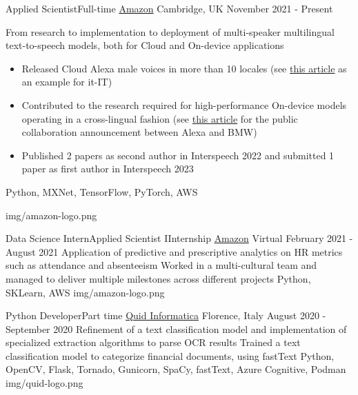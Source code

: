 
\begin{cventries}

  \logocventry
    {Applied Scientist{\enskip\cdotp\enskip}Full-time}
    {\href{https://www.amazon.com/}{Amazon}}
    {Cambridge, UK}
    {November 2021 - Present}
    {
      \cvexp
        {From research to implementation to deployment of multi-speaker multilingual text-to-speech models, both for Cloud and On-device applications}
        {
          \begin{itemize}[leftmargin=5.5mm, label=$\diamond$]
            \item Released Cloud Alexa male voices in more than 10 locales (see \textcolor{blue}{\href{https://www.hdblog.it/casa/articoli/n562569/alexa-cambia-voce-maschile-femminile-come-fare/}{this article}} as an example for it-IT)
            \item Contributed to the research required for high-performance On-device models operating in a cross-lingual fashion (see \textcolor{blue}{\href{https://www.aboutamazon.com/news/devices/amazon-bmw}{this article}} for the public collaboration announcement between Alexa and BMW)
            \item Published 2 papers as second author in Interspeech 2022 and submitted 1 paper as first author in Interspeech 2023
          \end{itemize}
          \vspace*{-5mm}
        }
        {Python, MXNet, TensorFlow, PyTorch, AWS}
    }
    {img/amazon-logo.png}

  \logocventry
    {Data Science Intern{\enskip\cdotp\enskip}Applied Scientist I{\enskip\cdotp\enskip}Internship}
    {\href{https://www.amazon.com/}{Amazon}}
    {Virtual}
    {February 2021 - August 2021}
    {
      \cvexp
        {Application of predictive and prescriptive analytics on HR metrics such as attendance and absenteeism}
        {Worked in a multi-cultural team and managed to deliver multiple milestones across different projects}
        {Python, SKLearn, AWS}
    }
    {img/amazon-logo.png}

  \logocventry
    {Python Developer{\enskip\cdotp\enskip}Part time}
    {\href{https://www.quidinfo.it/}{Quid Informatica}}
    {Florence, Italy}
    {August 2020 - September 2020}
    {
      \cvexp
        {Refinement of a text classification model and implementation of specialized extraction algorithms to parse OCR results}
        {Trained a text classification model to categorize financial documents, using fastText}
        {Python, OpenCV, Flask, Tornado, Gunicorn, SpaCy, fastText, Azure Cognitive, Podman}
    }
    {img/quid-logo.png}


\end{cventries}
